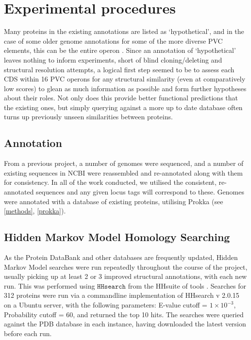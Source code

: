 \section{Experimental procedures}
	Many proteins in the existing \Pa{} annotations are listed as `hypothetical', and in the case of some older genome annotations for some of the more diverse PVC elements, this can be the entire operon \citep{Duchaud2003}. Since an annotation of `hypothetical' leaves nothing to inform experiments, short of blind cloning/deleting and structural resolution attempts, a logical first step seemed to be to assess each CDS within 16 PVC operons for any structural similarity (even at comparatively low scores) to glean as much information as possible and form further hypotheses about their roles. Not only does this provide better functional predictions that the existing ones, but simply querying against a more up to date database often turns up previously unseen similarities between proteins.
	
	\subsection{Annotation}\label{annotation}
	From a previous project, a number of \Pa{} genomes were sequenced, and a number of existing sequences in NCBI were reassembled and re-annotated along with them for consistency. In all of the work conducted, we utilised the consistent, re-annotated sequences and any given locus tags will correspond to these. Genomes were annotated with a database of existing \Pa{} proteins, utilising Prokka \citep{Seemann2014} (see \vref{methods},  \vref{prokka}).
	
	\subsection{Hidden Markov Model Homology Searching}\label{hhresults}
	As the Protein DataBank and other databases are frequently updated, Hidden Markov Model searches were run repeatedly throughout the course of the project, usually picking up at least 2 or 3 improved structural annotations, with each new run. This was performed using $\mathtt{HHsearch}$ from the HHsuite of tools \citep{Remmert2012}. Searches for 312 proteins were run via a commandline implementation of HHsearch v 2.0.15 on a Ubuntu server, with the following parameters: E-value cutoff = $1\times10^{-3}$, Probability cutoff = 60, and returned the top 10 hits. The searches were queried against the PDB database in each instance, having downloaded the latest version before each run.
	
